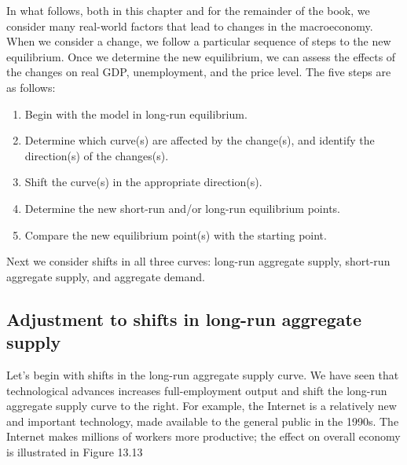 \documentclass[11pt]{article} %
\begin{document}
In what follows, both in this chapter and for the remainder of the book, we consider many real-world factors that lead to changes in the macroeconomy. When we consider a change, we follow a particular sequence of steps to the new equilibrium. Once we determine the new equilibrium, we can assess the effects of the changes on real GDP, unemployment, and the price level. The five steps are as follows:
\begin{enumerate}
\item Begin with the model in long-run equilibrium.
\item Determine which curve(s) are affected by the change(s), and identify the direction(s) of the changes(s).
\item Shift the curve(s) in the appropriate direction(s).
\item Determine the new short-run and/or long-run equilibrium points.
\item Compare the new equilibrium point(s) with the starting point.
\end{enumerate}
Next we consider shifts in all three curves: long-run aggregate supply, short-run aggregate supply, and aggregate demand.

\subsection*{Adjustment to shifts in long-run aggregate supply}
Let's begin with shifts in the long-run aggregate supply curve. We have seen that technological advances increases full-employment output and shift the long-run aggregate supply curve to the right. For example, the Internet is a relatively new and important technology, made available to the general public in the 1990s. The Internet makes millions of workers more productive; the effect on overall economy is illustrated in Figure 13.13
\end{document}
